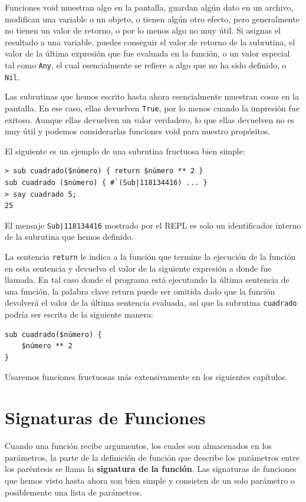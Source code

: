Funciones void muestran algo en la pantalla, guardan algún dato
en un archivo, modifican una variable o un objeto, o tienen
algún otro efecto, pero generalmente no tienen un valor de
retorno, o por lo menos algo no muy útil. Si asignas el resultado
a una variable, puedes conseguir el valor de retorno de la subrutina,
el valor de la última expresión que fue evaluada en la función,
o un valor especial tal como {\tt Any}, el cual esencialmente se
refiere a algo que no ha sido definido, o {\tt Nil}.
%

Las subrutinas que hemos escrito hasta ahora esencialmente muestran cosas
en la pantalla. En ese caso, ellas devuelven {\tt True}, por lo
menos cuando la impresión fue exitoso. Aunque ellas devuelven un 
valor verdadero, lo que ellas devuelven no es muy útil y podemos
considerarlas funciones void para nuestro propósitos.

El siguiente es un ejemplo de una subrutina fructuosa bien simple:

\begin{verbatim}
> sub cuadrado($número) { return $número ** 2 }
sub cuadrado ($número) { #`(Sub|118134416) ... }
> say cuadrado 5;
25
\end{verbatim}

El mensaje \verb'Sub|118134416' mostrado por el REPL
es solo un identificador interno de la subrutina que hemos
definido.

La sentencia {\tt return} le indica a la función que termine
la ejecución de la función en esta sentencia y devuelva el valor 
de la siguiente expresión a donde fue llamada. En tal caso 
donde el programa está ejecutando la última sentencia de una 
función, la palabra clave return puede ser omitida dado que la
función devolverá el valor de la última sentencia evaluada,
así que la subrutina {\tt cuadrado} podría ser escrita de 
la siguiente manera:
\begin{verbatim}
sub cuadrado($número) { 
    $número ** 2 
}
\end{verbatim}

Usaremos funciones fructuosas más extensivamente en los 
siguientes capítulos.

\section{Signaturas de Funciones}

Cuando una función recibe argumentos, los cuales son
almacenados en los parámetros, la parte de la definición
de función que describe los parámetros entre los 
paréntesis se llama la {\bf signatura de la función}. Las 
signaturas de funciones que hemos visto hasta ahora son bien 
simple y consisten de un solo parámetro o posiblemente
una lista de parámetros.

